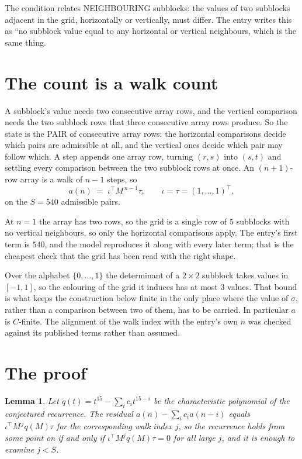 \documentclass[11pt,a4paper]{article}
\theoremstyle{plain}
\newtheorem{lemma}[theorem]{Lemma}
\theoremstyle{definition}
\begin{document}
The condition relates NEIGHBOURING subblocks: the values of two subblocks adjacent in the grid,
horizontally or vertically, must differ. The entry writes this as ``no subblock value equal to any horizontal or vertical neighbours, which is the same thing.

\section{The count is a walk count}

A subblock's value needs two consecutive array rows, and the vertical
comparison needs the two subblock rows that three consecutive array rows produce. So the state
is the PAIR of consecutive array rows: the horizontal comparisons decide which pairs are
admissible at all, and the vertical ones decide which pair may follow which. A step appends one
array row, turning $(r,s)$ into $(s,t)$ and settling every comparison between the two subblock
rows at once. An $(n+1)$-row array is a walk of $n-1$ steps, so
\[
a(n)\;=\;\iota^{\!\top}M^{\,n-1}\tau,\qquad\iota=\tau=(1,\dots,1)^{\!\top},
\]
on the $S=540$ admissible pairs.

At $n=1$ the array has two rows, so the grid is a single row of $5$
subblocks with no vertical neighbours, so only the horizontal comparisons apply. The
entry's first term is $540$, and the model reproduces it along with every later term; that
is the cheapest check that the grid has been read with the right shape.

Over the alphabet $\{0,\dots,1\}$ the determinant of a $2\times2$ subblock takes values in
$[-1,1]$, so the colouring of the grid it induces has at most $3$ values.
That bound is what keeps the construction below finite in the only place where the value of
$\sigma$, rather than a comparison between two of them, has to be carried.
In particular $a$ is $C$-finite. The alignment of the walk index with the entry's own $n$ was
checked against its published terms rather than assumed.

\section{The proof}

\begin{lemma}\label{lem:crit}
Let $q(t)=t^{15}-\sum_i c_it^{15-i}$ be the characteristic polynomial of the
conjectured recurrence. The residual $a(n)-\sum_ic_ia(n-i)$ equals
$\iota^{\!\top}M^{\,j}q(M)\tau$ for the corresponding walk index $j$, so the recurrence
holds from some point on if and only if $\iota^{\!\top}M^{j}q(M)\tau=0$ for all large $j$,
and it is enough to examine $j<S$.
\end{lemma}
\end{document}
